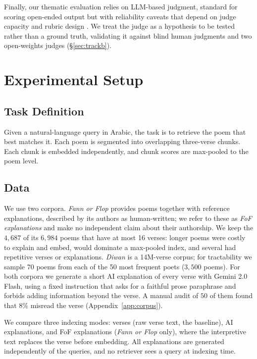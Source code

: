 \documentclass[11pt]{article}
\begin{document}
Finally, our thematic evaluation relies on LLM-based judgment, standard for scoring open-ended output but with reliability caveats that depend on judge capacity and rubric design \citep{zheng2023judging}. We treat the judge as a hypothesis to be tested rather than a ground truth, validating it against blind human judgments and two open-weights judges (\S\ref{sec:trackb}).

\section{Experimental Setup}
\label{sec:data}

\subsection{Task Definition}
\label{sec:task}

Given a natural-language query in Arabic, the task is to retrieve the poem that best matches it. Each poem is segmented into overlapping three-verse chunks. Each chunk is embedded independently, and chunk scores are max-pooled to the poem level.

\subsection{Data}
\label{sec:datasubsec}

We use two corpora. \textit{Fann or Flop} \citep{alghallabi2025fannorflop} provides poems together with reference explanations, described by its authors as human-written; we refer to these as \emph{FoF explanations} and make no independent claim about their authorship. We keep the $4{,}687$ of its $6{,}984$ poems that have at most 16 verses: longer poems were costly to explain and embed, would dominate a max-pooled index, and several had repetitive verses or explanations. \textit{Diwan} \citep{alonazi2025diwan} is a 14M-verse corpus; for tractability we sample 70 poems from each of the 50 most frequent poets ($3{,}500$ poems). For both corpora we generate a short AI explanation of every verse with Gemini 2.0 Flash, using a fixed instruction that asks for a faithful prose paraphrase and forbids adding information beyond the verse. A manual audit of $50$ of them found that $8\%$ misread the verse (Appendix~\ref{app:corpus}).

We compare three indexing modes: verses (raw verse text, the baseline), AI explanations, and FoF explanations (\textit{Fann or Flop} only), where the interpretive text replaces the verse before embedding. All explanations are generated independently of the queries, and no retriever sees a query at indexing time.
\end{document}
